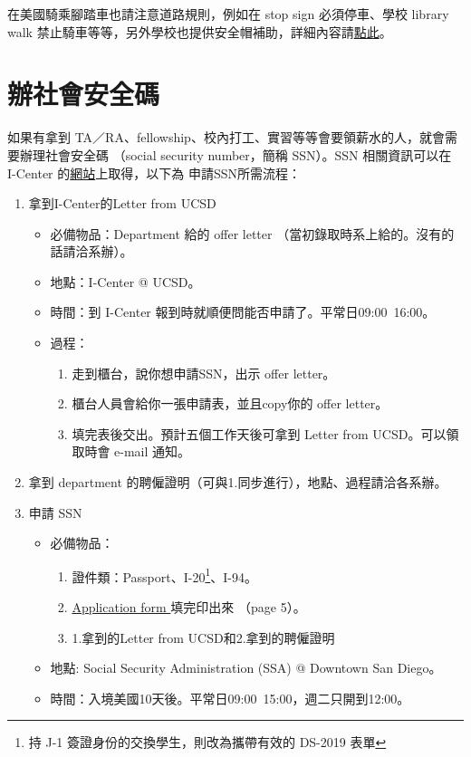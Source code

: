 \documentclass[10pt,a4paper]{book}
\begin{document}
\begin{CJK}{UTF8}{bkai}
在美國騎乘腳踏車也請注意道路規則，例如在 stop sign 必須停車、學校 library walk 禁止騎車等等，另外學校也提供安全帽補助，詳細內容請\href{http://transportation.ucsd.edu/alternatives/cycling/index.html#UC-San-Diego}{點此}。

\section{辦社會安全碼}
如果有拿到 TA／RA、fellowship、校內打工、實習等等會要領薪水的人，就會需要辦理社會安全碼 （social security number，簡稱 SSN）。SSN 相關資訊可以在 I-Center 的\href{https://ispo.ucsd.edu/current-students/working-in-usa/social-security.html}{網站}上取得，以下為 申請SSN所需流程：
\begin{enumerate}
\item 拿到I-Center的Letter from UCSD
	\begin{itemize}
	\item 必備物品：Department 給的 offer letter （當初錄取時系上給的。沒有的話請洽系辦）。
	\item 地點：I-Center @ UCSD。
	\item 時間：到 I-Center 報到時就順便問能否申請了。平常日09:00~16:00。
	\item 過程：
	\begin{enumerate}
		\item 走到櫃台，說你想申請SSN，出示 offer letter。
		\item 櫃台人員會給你一張申請表，並且copy你的 offer letter。
		\item 填完表後交出。預計五個工作天後可拿到 Letter from UCSD。可以領取時會 e-mail 通知。
	\end{enumerate}
	\end{itemize}
\item 拿到 department 的聘僱證明（可與1.同步進行），地點、過程請洽各系辦。
\item 申請 SSN
	\begin{itemize}
	\item 必備物品：
	\begin{enumerate}
		\item 證件類：Passport、I-20\footnote{持 J-1 簽證身份的交換學生，則改為攜帶有效的 DS-2019 表單}、I-94。
		\item \href{http://www.ssa.gov/forms/ss-5.pdf}{Application form }填完印出來 （page 5）。
		\item 1.拿到的Letter from UCSD和2.拿到的聘僱證明
	\end{enumerate}
	\item 地點: Social Security Administration (SSA) @ Downtown San Diego。
	\item 時間：入境美國10天後。平常日09:00~15:00，週二只開到12:00。
	\end{itemize}
\end{enumerate}


\end{CJK}
\end{document}
